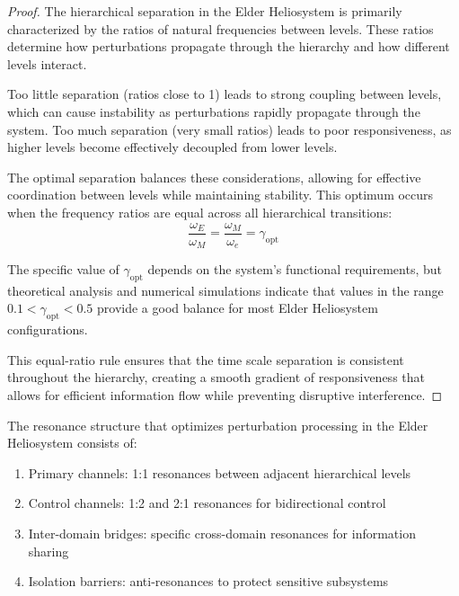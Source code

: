 \begin{proof}
The hierarchical separation in the Elder Heliosystem is primarily characterized by the ratios of natural frequencies between levels. These ratios determine how perturbations propagate through the hierarchy and how different levels interact.

Too little separation (ratios close to 1) leads to strong coupling between levels, which can cause instability as perturbations rapidly propagate through the system. Too much separation (very small ratios) leads to poor responsiveness, as higher levels become effectively decoupled from lower levels.

The optimal separation balances these considerations, allowing for effective coordination between levels while maintaining stability. This optimum occurs when the frequency ratios are equal across all hierarchical transitions:
\begin{equation}
\frac{\omega_E}{\omega_M} = \frac{\omega_M}{\omega_e} = \gamma_{\text{opt}}
\end{equation}

The specific value of $\gamma_{\text{opt}}$ depends on the system's functional requirements, but theoretical analysis and numerical simulations indicate that values in the range $0.1 < \gamma_{\text{opt}} < 0.5$ provide a good balance for most Elder Heliosystem configurations.

This equal-ratio rule ensures that the time scale separation is consistent throughout the hierarchy, creating a smooth gradient of responsiveness that allows for efficient information flow while preventing disruptive interference.
\end{proof}

\begin{theorem}
The resonance structure that optimizes perturbation processing in the Elder Heliosystem consists of:
\begin{enumerate}
    \item Primary channels: 1:1 resonances between adjacent hierarchical levels
    \item Control channels: 1:2 and 2:1 resonances for bidirectional control
    \item Inter-domain bridges: specific cross-domain resonances for information sharing
    \item Isolation barriers: anti-resonances to protect sensitive subsystems
\end{enumerate}
\end{theorem}

